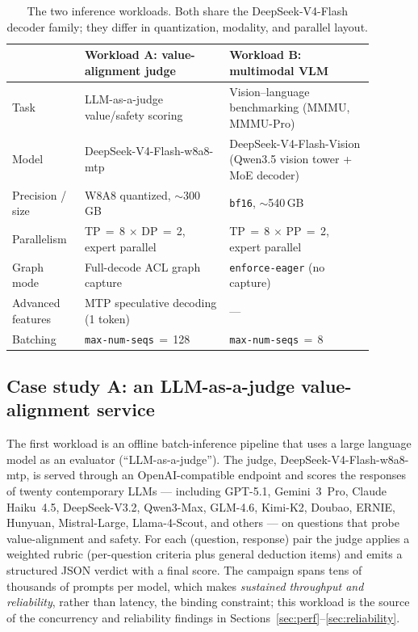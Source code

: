 \documentclass{article}
\newcommand{\code}[1]{\texttt{#1}}
\begin{document}
\begin{table}[t]
\centering
\caption{The two inference workloads. Both share the DeepSeek-V4-Flash decoder
family; they differ in quantization, modality, and parallel layout.}
\label{tab:workloads}
\small
\begin{tabular}{@{}p{0.17\linewidth}p{0.36\linewidth}p{0.36\linewidth}@{}}
\toprule
 & \textbf{Workload A: value-alignment judge} & \textbf{Workload B: multimodal VLM} \\
\midrule
Task & LLM-as-a-judge value/safety scoring & Vision--language benchmarking (MMMU, MMMU-Pro) \\
Model & DeepSeek-V4-Flash-w8a8-mtp & DeepSeek-V4-Flash-Vision (Qwen3.5 vision tower + MoE decoder) \\
Precision / size & W8A8 quantized, $\sim$300\,GB & \code{bf16}, $\sim$540\,GB \\
Parallelism & TP\,$=$\,8 $\times$ DP\,$=$\,2, expert parallel & TP\,$=$\,8 $\times$ PP\,$=$\,2, expert parallel \\
Graph mode & Full-decode ACL graph capture & \code{enforce-eager} (no capture) \\
Advanced features & MTP speculative decoding (1 token) & --- \\
Batching & \code{max-num-seqs}\,$=$\,128 & \code{max-num-seqs}\,$=$\,8 \\
\bottomrule
\end{tabular}
\end{table}

\subsection{Case study A: an LLM-as-a-judge value-alignment service}
\label{sec:workloadA}
The first workload is an offline batch-inference pipeline that uses a large
language model as an evaluator (``LLM-as-a-judge''). The judge,
DeepSeek-V4-Flash-w8a8-mtp, is served through an OpenAI-compatible endpoint and
scores the responses of twenty contemporary LLMs --- including GPT-5.1,
Gemini~3~Pro, Claude Haiku~4.5, DeepSeek-V3.2, Qwen3-Max, GLM-4.6,
Kimi-K2, Doubao, ERNIE, Hunyuan, Mistral-Large, Llama-4-Scout, and
others --- on questions that probe value-alignment and safety. For each
(question, response) pair the judge applies a weighted rubric (per-question
criteria plus general deduction items) and emits a structured JSON verdict with a
final score. The campaign spans tens of thousands of prompts per model, which
makes \emph{sustained throughput and reliability}, rather than latency, the
binding constraint; this workload is the source of the concurrency and
reliability findings in Sections~\ref{sec:perf}--\ref{sec:reliability}.
\end{document}
